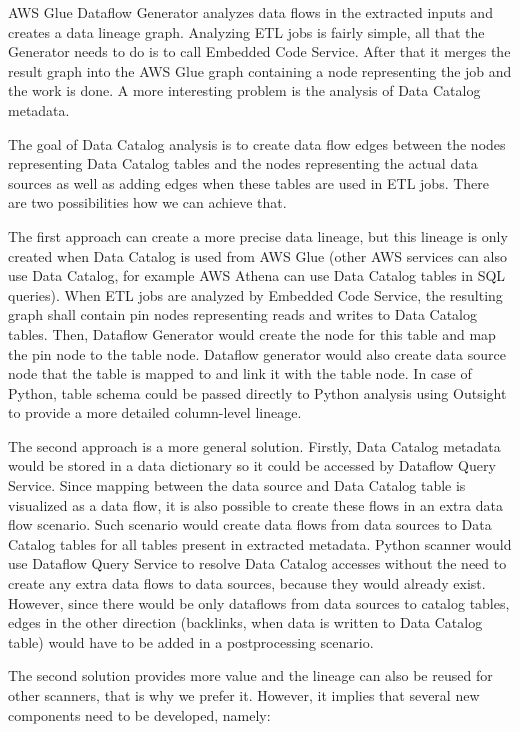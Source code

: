 AWS Glue Dataflow Generator analyzes data flows in the extracted inputs and creates a data lineage graph. Analyzing ETL jobs is fairly simple, all that the Generator needs to do is to call Embedded Code Service. After that it merges the result graph into the AWS Glue graph containing a node representing the job and the work is done. A more interesting problem is the analysis of Data Catalog metadata.
\par
The goal of Data Catalog analysis is to create data flow edges between the nodes representing Data Catalog tables and the nodes representing the actual data sources as well as adding edges when these tables are used in ETL jobs. There are two possibilities how we can achieve that.
\par
The first approach can create a more precise data lineage, but this lineage is only created when Data Catalog is used from AWS Glue (other AWS services can also use Data Catalog, for example AWS Athena can use Data Catalog tables in SQL queries). When ETL jobs are analyzed by Embedded Code Service, the resulting graph shall contain pin nodes representing reads and writes to Data Catalog tables. Then, Dataflow Generator would create the node for this table and map the pin node to the table node. Dataflow generator would also create data source node that the table is mapped to and link it with the table node. In case of Python, table schema could be passed directly to Python analysis using Outsight to provide a more detailed column-level lineage.
\par
The second approach is a more general solution. Firstly, Data Catalog metadata would be stored in a data dictionary so it could be accessed by Dataflow Query Service. Since mapping between the data source and Data Catalog table is visualized as a data flow, it is also possible to create these flows in an extra data flow scenario. Such scenario would create data flows from data sources to Data Catalog tables for all tables present in extracted metadata. Python scanner would use Dataflow Query Service to resolve Data Catalog accesses without the need to create any extra data flows to data sources, because they would already exist. However, since there would be only dataflows from data sources to catalog tables, edges in the other direction (backlinks, when data is written to Data Catalog table) would have to be added in a postprocessing scenario.
\par
The second solution provides more value and the lineage can also be reused for other scanners, that is why we prefer it. However, it implies that several new components need to be developed, namely:
